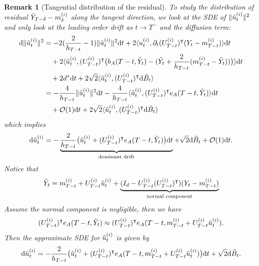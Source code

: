 \documentclass[11pt]{article}
\newcommand{\dee}{\mathrm{d}}
\newcommand{\mc}{\mathcal}
\newtheorem{remark}{Remark}[section]
\begin{document}
\begin{remark}[Tangential distribution of the residual] To study the distribution of residual $\Tilde{Y}_{T-\delta}-m_{\delta}^{(i)}$ along the tangent direction, we look at the SDE of $\|\Tilde{u}_t^{(i)}\|^2$ and only look at the leading order drift as $t\to T^-$ and the diffusion term:
\begin{align*}
    \dee \| \Tilde{u}_t^{(i)}\|^2 &= -2(\frac{2}{h_{T-t}}-1) \|\Tilde{u}_t^{(i)}\|^2 \dee t + 2 \langle u_t^{(i)}, \partial_t (U_{T-t}^{(i)})^\intercal (Y_t-m_{T-t}^{(i)}) \rangle \dee t \\
    &\quad + 2\langle \Tilde{u}_t^{(i)}, (U_{T-t}^{(i)})^\intercal\big( b_A(T-t,\Tilde{Y}_t)- ( \Tilde{Y_t} +\frac{2}{h_{T-t}}(m_{T-t}^{(i)}-\Tilde{Y}_t) ) \big)\rangle \dee t \\
    & \quad + 2d^* \dee t + 2\sqrt{2} \langle \Tilde{u}_t^{(i)}, (U_{T-t}^{(i)})^\intercal \dee \Tilde{B}_t\rangle\\
    & = -\frac{4}{h_{T-t}} \|\Tilde{u}_t^{(i)}\|^2 \dee t  - \frac{4}{h_{T-t}}\langle \Tilde{u}_t^{(i)}, (U_{T-t}^{(i)})^\intercal e_A(T-t,\Tilde{Y}_t)\rangle \dee t \\
    & \quad + \mc{O}(1) \dee t + 2\sqrt{2} \langle \Tilde{u}_t^{(i)}, (U_{T-t}^{(i)})^\intercal \dee \Tilde{B}_t\rangle
\end{align*}
which implies
\begin{align*}
    \dee \Tilde{u}_t^{(i)} = -\underbrace{\frac{2}{h_{T-t}}\big( \Tilde{u}_t^{(i)} +  (U_{T-t}^{(i)})^\intercal e_A(T-t,\Tilde{Y}_t) \big)\dee t}_{\text{dominant drift}} + \sqrt{2}\dee \Tilde{B}_t + \mc{O}(1)\dee t.
\end{align*}
Notice that 
\begin{align*}
    \Tilde{Y}_t = m_{T-t}^{(i)} + U_{T-t}^{(i)}\Tilde{u}_t^{(i)} + \underbrace{(I_d - U_{T-t}^{(i)}(U_{T-t}^{(i)})^\intercal) (Y_t-m_{T-t}^{(i)})}_{\text{normal component}}
\end{align*}
Assume the normal component is negligible, then we have 
\begin{align*}
    (U_{T-t}^{(i)})^\intercal e_A(T-t,\Tilde{Y}_t)  \approx (U_{T-t}^{(i)})^\intercal e_A(T-t,m_{T-t}^{(i)} + U_{T-t}^{(i)}\Tilde{u}_t^{(i)}) .
\end{align*}
Then the approximate SDE for $\Tilde{u}_t^{(i)}$ is given by
\begin{align}\label{eq:tangential sde}
    \dee \Tilde{u}_t^{(i)} = -\frac{2}{h_{T-t}}\big( \Tilde{u}_t^{(i)} +  (U_{T-t}^{(i)})^\intercal e_A(T-t,m_{T-t}^{(i)} + U_{T-t}^{(i)}\Tilde{u}_t^{(i)}) \big)\dee t + \sqrt{2}\dee \Tilde{B}_t .
\end{align}
    
\end{remark}
\end{document}
